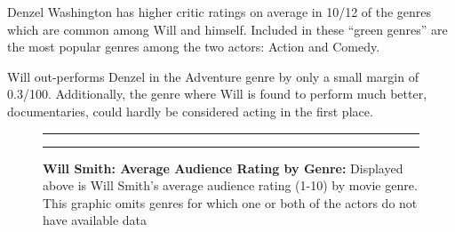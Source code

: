 \documentclass[]{article}
\begin{document}
\noindent Denzel Washington has higher critic ratings on average in
10/12 of the genres which are common among Will and himself. Included in
these ``green genres'' are the most popular genres among the two actors:
Action and Comedy. \newline

\noindent Will out-performs Denzel in the Adventure genre by only a
small margin of 0.3/100. Additionally, the genre where Will is found to
perform much better, documentaries, could hardly be considered acting in
the first place. \newline

\begin{figure}[!ht]
 \label{fig:one-graphic}
    \begin{center}
    \end{center}
    \hrule
      \vspace{2mm}
    \caption{ \textbf{Will Smith: Average Audience Rating by Genre:} \newline \footnotesize{ Displayed above is Will Smith's average audience rating (1-10) by movie genre. This graphic omits genres for which one or both of the actors do not have available data}  }
    \vspace{2mm}
    \hrule
\end{figure}
\end{document}
